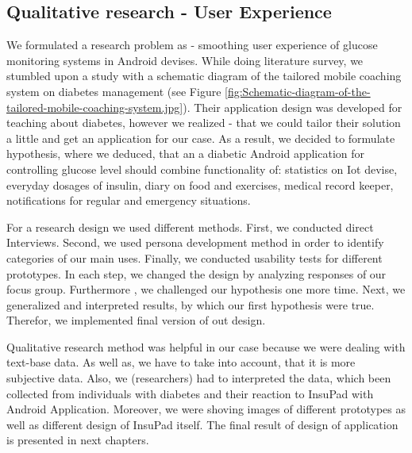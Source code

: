 
\subsection{Qualitative research - User Experience}

\par We formulated a research problem as - smoothing user experience of glucose monitoring systems in Android devises.  While doing literature survey, we stumbled upon a study with a schematic diagram of the tailored mobile coaching system on diabetes management (see Figure \ref{fig:Schematic-diagram-of-the-tailored-mobile-coaching-system.jpg}). Their application design was developed for teaching about diabetes, however we realized - that we could tailor their solution a little and get an application for our case. As a result, we decided to formulate hypothesis, where we deduced, that an a diabetic Android application for controlling glucose level should combine functionality of: statistics on Iot devise, everyday dosages of insulin, diary on food and exercises, medical record keeper, notifications for regular and emergency situations. 

\par For a research design we used different methods. First, we conducted direct Interviews. Second, we used persona development method in order to identify categories of our main uses. Finally, we conducted usability tests for different prototypes. In each step, we changed the design by analyzing responses of our focus group. Furthermore , we challenged our hypothesis one more time. Next, we generalized and interpreted results, by which our first hypothesis were true. Therefor, we implemented final version of out design. 


\par Qualitative research method was helpful in our case because we were dealing with text-base data. As well as, we have to take into account, that it is more subjective data. Also, we (researchers) had to interpreted the data, which been collected from individuals with diabetes and their reaction to InsuPad with Android Application. Moreover, we were shoving images of different prototypes as well as different design of InsuPad itself. The final result of design of application is presented in next chapters.

